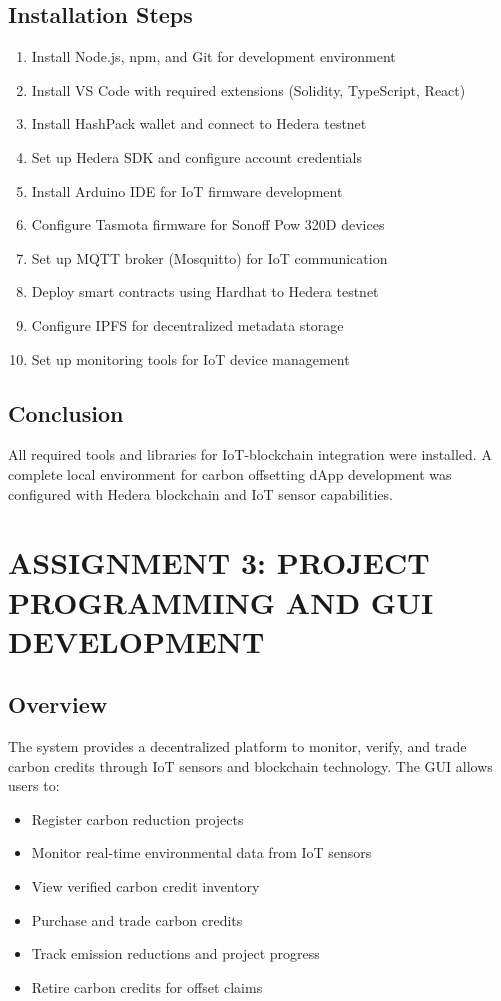 \documentclass[oneside,a4paper,12pt]{book}
\begin{document}
\begin{appendices}
\subsection{Installation Steps}
\begin{enumerate}
    \item Install Node.js, npm, and Git for development environment
    \item Install VS Code with required extensions (Solidity, TypeScript, React)
    \item Install HashPack wallet and connect to Hedera testnet
    \item Set up Hedera SDK and configure account credentials
    \item Install Arduino IDE for IoT firmware development
    \item Configure Tasmota firmware for Sonoff Pow 320D devices
    \item Set up MQTT broker (Mosquitto) for IoT communication
    \item Deploy smart contracts using Hardhat to Hedera testnet
    \item Configure IPFS for decentralized metadata storage
    \item Set up monitoring tools for IoT device management
\end{enumerate}

\subsection{Conclusion}
All required tools and libraries for IoT-blockchain integration were installed. A complete local environment for carbon offsetting dApp development was configured with Hedera blockchain and IoT sensor capabilities.

\newpage

\section{ASSIGNMENT 3: PROJECT PROGRAMMING AND GUI DEVELOPMENT}

\subsection{Overview}
The system provides a decentralized platform to monitor, verify, and trade carbon credits through IoT sensors and blockchain technology. The GUI allows users to:
\begin{itemize}
    \item Register carbon reduction projects
    \item Monitor real-time environmental data from IoT sensors
    \item View verified carbon credit inventory
    \item Purchase and trade carbon credits
    \item Track emission reductions and project progress
    \item Retire carbon credits for offset claims
\end{itemize}


\end{appendices}
\end{document}
